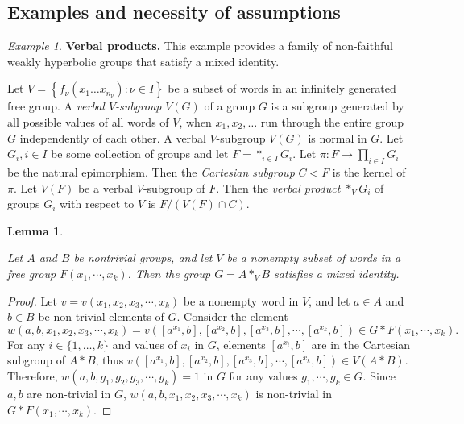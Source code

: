 \documentclass[11pt,letterpaper]{article}
\newtheorem{lem}[thm]{Lemma}
\theoremstyle{definition}
\theoremstyle{remark}
\newtheorem{ex}[thm]{Example}
\begin{document}
\subsection{Examples and necessity of assumptions}\label{examples}

\begin{ex}\label{Verbal products}
{\bf Verbal products.}
This example provides a family of non-faithful weakly hyperbolic groups that satisfy a mixed identity.

Let $V=\left\{f_\nu\left(x_1 \ldots x_{n_\nu}\right): \nu \in I\right\}$ be a subset of words in an infinitely generated free group. A {\it verbal $V$-subgroup} $V(G)$ of a group $G$ is a subgroup generated by all possible values of all words of $V$, when $x_1, x_2, \ldots$ run through the entire group $G$ independently of each other. A verbal $V$-subgroup $V(G)$ is normal in $G$. Let $G_i, i \in I$ be some collection of groups and let $F = *_{i\in I}G_i$. Let $\pi \colon F  \longrightarrow \prod_{i\in I}G_i$ be the natural epimorphism. Then the {\it Cartesian subgroup} $C < F$ is the kernel of $\pi$. Let $V(F)$ be a verbal $V$-subgroup of $F$. Then the {\it verbal product} $*_V G_i$ of groups $G_i$ with respect to $V$ is $F/(V(F) \cap C)$.
\end{ex}
\begin{lem}\label{Verbal products are not MIF}

Let $A$ and $B$ be nontrivial groups, and let $V$ be a nonempty subset of words in a free group $F(x_1, \cdots, x_k)$. Then the group $G=A *_V B$ satisfies a mixed identity.
\end{lem}
\begin{proof}
Let $v=v(x_1, x_2, x_3, \cdots, x_k)$ be a nonempty word in $V$, and let $a \in A$ and $b \in B$ be non-trivial elements of $G$. Consider the element  
$$w(a,b,x_1, x_2, x_3, \cdots, x_k)=v([a^{x_1},b], [a^{x_2}, b], [a^{x_3},b], \cdots, [a^{x_k}, b]) \in G*F(x_1, \cdots, x_k).$$ For any $i \in \{1, \dots, k\}$ and values of $x_i$ in $G$, elements $[a^{x_i}, b]$ are in the Cartesian subgroup of $A*B$, thus $v([a^{x_1},b], [a^{x_2}, b], [a^{x_3},b], \cdots, [a^{x_k}, b]) \in V(A*B)$. Therefore, $w(a,b,g_1, g_2, g_3, \cdots, g_k)=1$ in $G$ for any values $g_1, \cdots, g_k \in G$. Since $a, b$ are non-trivial in $G$, $w(a,b,x_1, x_2, x_3, \cdots, x_k)$ is non-trivial in $G*F(x_1, \cdots, x_k)$.
\end{proof}
\end{document}

